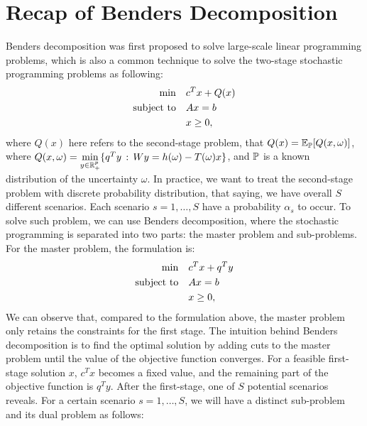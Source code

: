 \documentclass[preprint,review,11pt,authoryear]{elsarticle}
\begin{document}
\section{Recap of Benders Decomposition} \label{app:Benders_Recap}
Benders decomposition was first proposed to solve large-scale linear programming problems, which is also a common technique to solve the two-stage stochastic programming problems as following:
\begin{subequations}
\begin{align*}
          \min \quad & c^T x + Q(x) \\
    \subjectto \quad & Ax = b \\
                     &  x \geq 0,
\end{align*}
\end{subequations}
where $Q(x)$ here refers to the second-stage problem, that $Q(x) = \Embb_\P[Q(x,\omega)]$, where $Q(x,\omega) = \min \limits_{y \in \Rmbb^p_+} \{ q^T y\,:\, Wy = h(\omega) - T(\omega)x \}$, and $\P$ is a known distribution of the uncertainty $\omega$. In practice, we want to treat the second-stage problem with discrete probability distribution, that saying, we have overall $S$ different scenarios. Each scenario $s = 1,\dots,S$ have a probability $\alpha_s$ to occur. To solve such problem, we can use Benders decomposition, where the stochastic programming is separated into two parts: the master problem and sub-problems. For the master problem, the formulation is:
\begin{align*}
          \min \quad & c^T x + q^T y \\
    \subjectto \quad & Ax = b \\
                     &  x \geq 0,
\end{align*}
We can observe that, compared to the formulation above, the master problem only retains the constraints for the first stage. The intuition behind Benders decomposition is to find the optimal solution by adding cuts to the master problem until the value of the objective function converges. For a feasible first-stage solution $x$, $c^T x$ becomes a fixed value, and the remaining part of the objective function is $q^T y$. After the first-stage, one of $S$ potential scenarios reveals. For a certain scenario $s = 1, \dots, S$, we will have a distinct sub-problem and its dual problem as follows:
\end{document}
